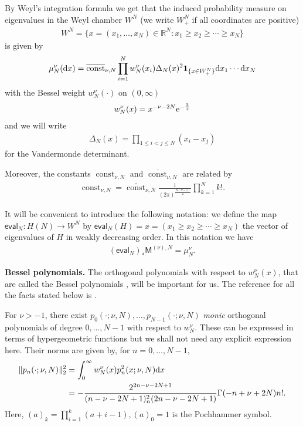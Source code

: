 \documentclass[pdftex]{sigma}
\numberwithin{equation}{section}
\begin{document}
By Weyl's integration formula we get that the induced probability measure on eigenvalues in the Weyl chamber $W^N$ (we write $W^N_+$ if all coordinates are positive)
\begin{gather*}
W^N=\big\{x=(x_1,\dots,x_N) \in \mathbb{R}^N\colon x_1 \ge x_2 \ge \cdots \ge x_N \big\}
\end{gather*}
is given by
\begin{gather*}
\mu_N^{\nu}({\rm d}x)=\overline{\operatorname{const}}_{\nu, N}\prod_{i=1}^{N}w_N^{\nu}(x_i)\Delta_N(x)^2\mathbf{1}_{ \{x \in W_+^N \}}{\rm d}x_1\cdots {\rm d}x_N
\end{gather*}
with the Bessel weight $w_N^{\nu}(\cdot)$ on $(0,\infty)$
\begin{gather*}
w_N^{\nu}(x)=x^{-\nu-2N}{\rm e}^{-\frac{2}{x}}
\end{gather*}
and we will write
\begin{gather*}
\Delta_N(x)=\prod_{1 \le i<j \le N}^{}(x_i-x_j)
\end{gather*}
for the Vandermonde determinant.

Moreover, the constants $\operatorname{const}_{\nu, N}$ and $\overline{\operatorname{const}}_{\nu, N}$ are related by
\begin{gather*}
\operatorname{const}_{\nu, N}=\overline{\operatorname{const}}_{\nu, N}\frac{1}{(2\pi)^\frac{N(N-1)}{2}}\prod_{k=1}^{N}k!.
\end{gather*}

It will be convenient to introduce the following notation: we define the map $\mathsf{eval}_N\colon H(N) \to W^N$ by $\mathsf{eval}_N(H)=x=(x_1\ge x_2 \ge \cdots \ge x_N )$ the vector of eigenvalues of $H$ in weakly decreasing order. In this notation we have
\begin{gather*}
 (\mathsf{eval}_N )_*\mathsf{M}^{(\nu),N}=\mu_N^{\nu}.
\end{gather*}

{\bf Bessel polynomials.} The orthogonal polynomials with respect to $w_N^{\nu}(x)$, that are called the Bessel polynomials \cite{BesselPolynomials}, will be important for us. The reference for all the facts stated below is \cite[Chapter~9.13, pp.~244--247]{HypergeometricOrthogonalPolynomials}.

 For $\nu>-1$, there exist $p_0(\cdot;\nu,N),\dots,p_{N-1}(\cdot;\nu,N)$ \textit{monic} orthogonal polynomials of degree $0,\dots, N-1$ with respect to $w_N^{\nu}$. These can be expressed in terms of hypergeometric functions but we shall not need any explicit expression here. Their norms are given by, for $n=0, \dots, N-1$,
\begin{align*}
\|p_n(\cdot;\nu,N)\|_2^2&= \int_{0}^{\infty}w_N^{\nu}(x)p_n^2(x;\nu,N){\rm d}x\\
&=-\frac{2^{2n-\nu-2N+1}}{(n-\nu-2N+1)_n^2(2n-\nu-2N+1)}\Gamma(-n+\nu+2N)n!.
\end{align*}
Here, $(a)_k=\prod\limits_{i=1}^{k}(a+i-1), (a)_0=1$ is the Pochhammer symbol.
\end{document}
